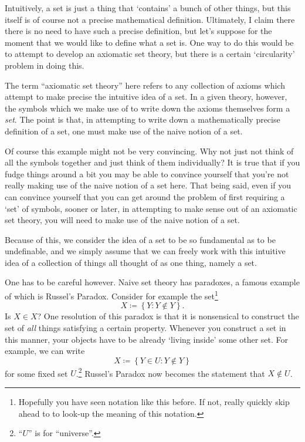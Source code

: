 Intuitively, a set is just a thing that `contains' a bunch of other things, but this itself is of course not a precise mathematical definition.  Ultimately, I claim there there is no need to have such a precise definition, but let's suppose for the moment that we would like to define what a set is.  One way to do this would be to attempt to develop an axiomatic set theory, but there is a certain `circularity' problem in doing this.

The term ``axiomatic set theory'' here refers to any collection of axioms which attempt to make precise the intuitive idea of a set.  In a given theory, however, the symbols which we make use of to write down the axioms themselves form a \emph{set}.  The point is that, in attempting to write down a mathematically precise definition of a set, one must make use of the naive notion of a set.

Of course this example might not be very convincing.  Why not just not think of all the symbols together and just think of them individually?  It is true that if you fudge things around a bit you may be able to convince yourself that you're not really making use of the naive notion of a set here.  That being said, even if you can convince yourself that you can get around the problem of first requiring a `set' of symbols, sooner or later, in attempting to make sense out of an axiomatic set theory, you will need to make use of the naive notion of a set.

Because of this, we consider the idea of a set to be so fundamental as to be undefinable, and we simply assume that we can freely work with this intuitive idea of a collection of things all thought of as one thing, namely a set.

One has to be careful however.  Naive set theory has paradoxes, a famous example of which is Russel's Paradox.  Consider for example the set\footnote{Hopefully you have seen notation like this before.  If not, really quickly skip ahead to  to look-up the meaning of this notation.}
\begin{equation}\label{A.1.1}
X\coloneqq \left\{ Y:Y\notin Y\right\} .
\end{equation}
Is $X\in X$?  One resolution of this paradox is that it is nonsensical to construct the set of \emph{all} things satisfying a certain property.  Whenever you construct a set in this manner, your objects have to be already `living inside' some other set.  For example, we can write
\begin{equation}
X\coloneqq \left\{ Y\in U:Y\notin Y\right\}
\end{equation}
for some fixed set $U$.\footnote{``$U$'' is for ``universe''.}  Russel's Paradox now becomes the statement that $X\notin U$.


